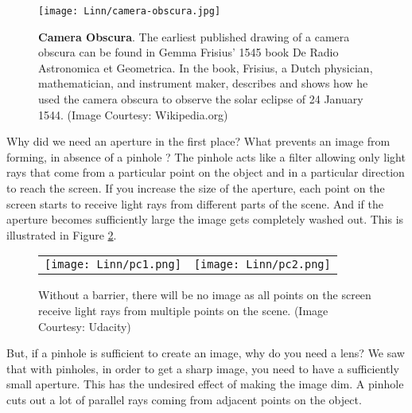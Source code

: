 \documentclass{../template/texnote}
\begin{document}
\begin{figure}
    \centering
    \texttt{[image: Linn/camera-obscura.jpg]}
    \caption{\textbf{Camera Obscura}. The earliest published drawing of a camera obscura can be found in Gemma Frisius' 1545 book De Radio Astronomica et Geometrica. In the book, Frisius, a Dutch physician, mathematician, and instrument maker, describes and shows how he used the camera obscura to observe the solar eclipse of 24 January 1544. (Image Courtesy: Wikipedia.org)}
    \label{fig:my_label}
\end{figure}

Why did we need an aperture in the first place? What prevents an image from forming, in absence of a pinhole ?
The pinhole acts like a filter allowing only light rays that come from a particular point on the object and in a particular direction to reach the screen.
If you increase the size of the aperture, each point on the screen starts to receive light rays from different parts of the scene. And if the aperture becomes sufficiently large the image gets completely washed out.
This is illustrated in Figure \ref{fig:pinhole_cam}.
\begin{figure}
\begin{tabular}{cc}
  \texttt{[image: Linn/pc1.png]} &   \texttt{[image: Linn/pc2.png]} \\
\end{tabular}
\caption{Without a barrier, there will be no image as all points on the screen receive light rays from multiple points on the scene. (Image Courtesy: Udacity)
}
\label{fig:pinhole_cam}
\end{figure}
But, if a pinhole is sufficient to create an image, why do you need a lens? We saw that with pinholes, in order to get a sharp image, you need to have a sufficiently small aperture. This has the undesired effect of making the image dim. A pinhole cuts out a lot of parallel rays coming from adjacent points on the object.
\end{document}
